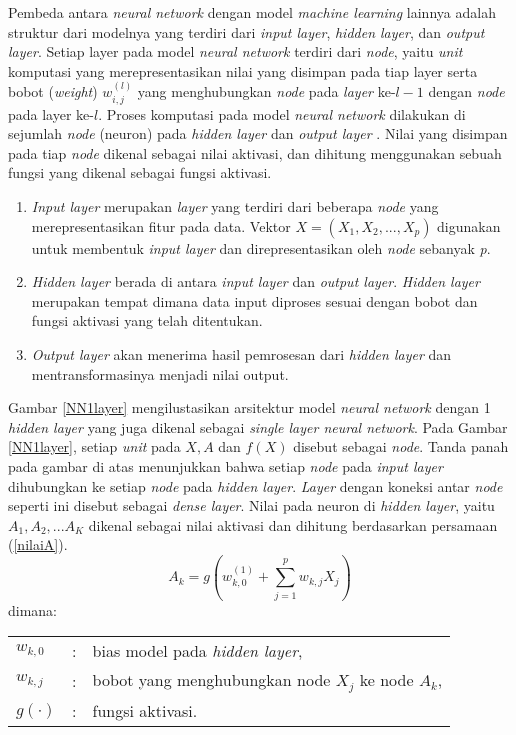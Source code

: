 \documentclass[a4paper,12pt]{report}
\begin{document}
Pembeda antara \textit{neural network} dengan model \textit{machine learning} lainnya adalah struktur dari modelnya yang terdiri dari \textit{input layer}, \textit{hidden layer}, dan \textit{output layer}. Setiap layer pada model \textit{neural network} terdiri dari \textit{node}, yaitu \textit{unit} komputasi yang merepresentasikan nilai yang disimpan pada tiap layer serta bobot (\textit{weight}) $w_{i,j}^{(l)}$ yang menghubungkan \textit{node} pada \textit{layer} ke-$l-1$ dengan \textit{node} pada layer ke-$l$. Proses komputasi pada model \textit{neural network} dilakukan di sejumlah \textit{node} (neuron) pada \textit{hidden layer} dan \textit{output layer} \cite{sohilIntroductionStatisticalLearning2022}\cite{qamarArtificialNeuralNetworks2023}. Nilai yang disimpan pada tiap \textit{node} dikenal sebagai nilai aktivasi, dan dihitung menggunakan sebuah fungsi yang dikenal sebagai fungsi aktivasi. 
\begin{enumerate}
	\item \textit{Input layer} merupakan \textit{layer} yang terdiri dari beberapa \textit{node} yang merepresentasikan fitur pada data. Vektor $X = (X_{1}, X_{2}, ..., X_{p})$ digunakan untuk membentuk \textit{input layer} dan direpresentasikan oleh \textit{node} sebanyak \textit{p}. 
	\item \textit{Hidden layer} berada di antara \textit{input layer} dan \textit{output layer}. \textit{Hidden layer} merupakan tempat dimana data input diproses sesuai dengan bobot dan fungsi aktivasi yang telah ditentukan.
	\item  \textit{Output layer} akan menerima hasil pemrosesan dari \textit{hidden layer} dan mentransformasinya menjadi nilai output.
\end{enumerate}

Gambar \ref{NN1layer} mengilustasikan arsitektur model \textit{neural network} dengan 1 \textit{hidden layer} yang juga dikenal sebagai \textit{single layer neural network}. Pada Gambar \ref{NN1layer}, setiap \textit{unit} pada $X, A$ dan $f(X)$ disebut sebagai \textit{node}. Tanda panah pada gambar di atas menunjukkan bahwa setiap \textit{node} pada \textit{input layer} dihubungkan ke setiap \textit{node} pada \textit{hidden layer}. \textit{Layer} dengan koneksi antar \textit{node} seperti ini disebut sebagai \textit{dense layer}. Nilai pada neuron di \textit{hidden layer}, yaitu $A_{1}, A_{2}, ... A_{K}$ dikenal sebagai nilai aktivasi dan dihitung berdasarkan persamaan (\ref{nilaiA}).
\begin{equation}
	A_{k}= g\left(w_{k,0}^{(1)} + \sum\limits_{j=1}^{p}w_{k,j}X_{j}\right)
	\label{nilaiA}
\end{equation}
\noindent dimana: \\
\begin{tabular}{l c l}
	$w_{k,0}$ &:& bias model pada \textit{hidden layer}, \\
	$w_{k,j}$ &:& bobot yang menghubungkan node $X_j$ ke node $A_k$, \\
	$g(\cdot)$ &:& fungsi aktivasi.
\end{tabular} \\
\end{document}
